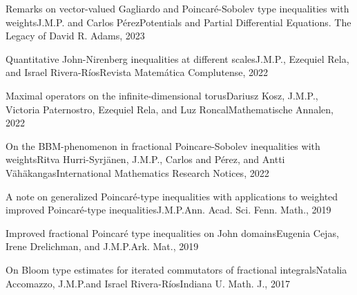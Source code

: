 \documentclass[a4paper,10pt]{article}
\begin{document}
	\begin{refitem}
		{Remarks on vector-valued Gagliardo and Poincar\'{e}-Sobolev type inequalities with weights}{J.M.P. and Carlos P\'erez}{Potentials and Partial Differential Equations. The Legacy of David R. Adams, 2023}
	\end{refitem}

	\begin{refitem}
		{Quantitative John-Nirenberg inequalities at different scales}{J.M.P., Ezequiel Rela, and Israel Rivera-R\'ios}{Revista Matemática Complutense, 2022}
	\end{refitem}

	\begin{refitem}
		{Maximal operators on the infinite-dimensional torus}{Dariusz Kosz, J.M.P., Victoria  Paternostro, Ezequiel Rela, and Luz Roncal}{Mathematische Annalen, 2022}
	\end{refitem}

	\begin{refitem}
		{On the BBM-phenomenon in fractional Poincare-Sobolev inequalities with weights}{Ritva Hurri-Syrj{\"a}nen, J.M.P., Carlos and P\'erez, and Antti V{\"a}h{\"a}kangas}{International Mathematics Research Notices, 2022}
	\end{refitem}

	\begin{refitem}
		{A note on generalized Poincar\'e-type inequalities with applications to weighted improved Poincar\'e-type inequalities}{J.M.P.}{Ann. Acad. Sci. Fenn. Math., 2019}
	\end{refitem}

	\begin{refitem}
		{Improved fractional Poincar\'e type inequalities on John domains}{Eugenia Cejas, Irene Drelichman, and J.M.P.}{Ark. Mat., 2019}
	\end{refitem}

	\begin{firstrefitem}
		{On Bloom type estimates for iterated commutators of fractional integrals}{Natalia Accomazzo, J.M.P.and Israel Rivera-R\'ios}{Indiana U. Math. J., 2017}
	\end{firstrefitem}


\end{document}
